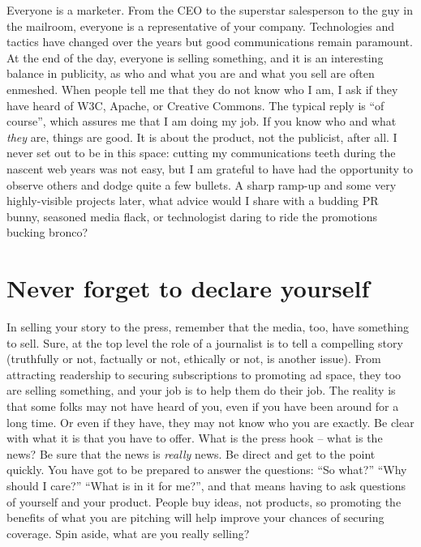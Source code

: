

Everyone is a marketer. From the CEO to the superstar salesperson to the guy in
the mailroom, everyone is a representative of your company. Technologies and
tactics have changed over the years but good communications remain paramount. At
the end of the day, everyone is selling something, and it is an interesting
balance in publicity, as who and what you are and what you sell are often
enmeshed. When people tell me that they do not know who I am, I ask if they have
heard of W3C, Apache, or Creative Commons. The typical reply is ``of course'',
which assures me that I am doing my job. If you know who and what \textit{they} are,
things are good. It is about the product, not the publicist, after all. I never
set out to be in this space: cutting my communications teeth during the nascent
web years was not easy, but I am grateful to have had the opportunity to observe
others and dodge quite a few bullets. A sharp ramp-up and some very
highly-visible projects later, what advice would I share with a budding PR bunny,
seasoned media flack, or technologist daring to ride the promotions bucking bronco?

\section*{Never forget to declare yourself}
In selling your story to the press, remember that the media, too, have something
to sell. Sure, at the top level the role of a journalist is to tell a compelling
story (truthfully or not, factually or not, ethically or not, is another issue).
From attracting readership to securing subscriptions to promoting ad space, they
too are selling something, and your job is to help them do their job. The
reality is that some folks may not have heard of you, even if you have been around
for a long time. Or even if they have, they may not know who you are exactly. Be
clear with what it is that you have to offer. What is the press hook -- what is
the news? Be sure that the news is \textit{really} news. Be direct and get to the point
quickly. You have got to be prepared to answer the questions: ``So what?'' ``Why
should I care?'' ``What is in it for me?'', and that means having to ask questions
of yourself and your product. People buy ideas, not products, so promoting the
benefits of what you are pitching will help improve your chances of securing coverage.
Spin aside, what are you really selling?

